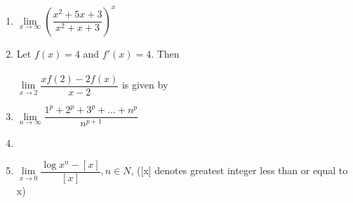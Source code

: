 \documentclass[journal,12pt,twocolumn]{IEEEtran}
\begin{document}
\begin{enumerate}
\item $\lim\limits_{x \to \infty}\left(\dfrac{x^2+5x+3}{x^2+x+3}\right)^x$
\begin{itemize}
\end{itemize}

\item Let $f(x)=4$ and $f'(x)=4$. Then\\ \\ $\lim\limits_{x \to 2}\dfrac{xf(2)-2f(x)}{x-2}$ is given by
\begin{itemize}
\end{itemize}

\item$\lim\limits_{n \to \infty}\dfrac{1^p+2^p+3^p+...+n^p}{n^{p+1}}$
\begin{itemize}
\end{itemize}

\item[~] \item $\lim\limits_{x \to 0}\dfrac{\log x^n-[x]}{[x]}, n \in N$, ([x] denotes greatest integer less than or equal to x)
\begin{itemize}
\end{itemize}


\end{enumerate}
\end{document}
